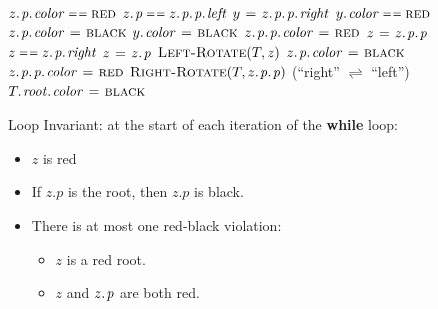 \documentclass{beamer}
\newcommand{\bi}{\begin{itemize}}
\newcommand{\ii}{\item}
\newcommand{\ei}{\end{itemize}}
\newcommand{\sect}[1]{
\section{#1}
\begin{frame}[fragile]\frametitle{#1}
}
\begin{document}
\newcommand{\rbinsertfixup}{
\begin{codebox}
  \Procname{$\proc{RB-Insert-Fixup}(T,z)$}
  \li \While $\attrib{\attrib{z}{p}}{color} \isequal \const{red}$\Do
  \li \If $\attrib{z}{p} \isequal
  \attrib{\attrib{\attrib{z}{p}}{p}}{left}$ \Do
  \li $y \gets \attrib{\attrib{\attrib{z}{p}}{p}}{right}$
  \li \If $\attrib{y}{color} \isequal \const{red}$\Do 
  \li $\attrib{\attrib{z}{p}}{color} \gets \const{black}$
  \li $\attrib{y}{color}\gets \const{black}$
  \li $\attrib{\attrib{\attrib{z}{p}}{p}}{color} \gets \const{red}$
  \li $z\gets\attrib{\attrib{z}{p}}{p}$
  \li \Else \If $z\isequal\attrib{\attrib{z}{p}}{right}$ \Do
             \li $z\gets\attrib{z}{p}$ %
             \li $\proc{Left-Rotate}(T,z)$ \End
  \li $\attrib{\attrib{z}{p}}{color} \gets \const{black}$
  \li $\attrib{\attrib{\attrib{z}{p}}{p}}{color} \gets \const{red}$
  \li $\proc{Right-Rotate}(T,\attrib{\attrib{z}{p}}{p})$
\End
  \li \Else \li (``right'' $\rightleftharpoons$ ``left'') \End
\End
  \li $\attrib{\attrib{T}{root}}{color} \gets \const{black}$
\end{codebox}
}
\sect{}
\begin{multicols}{2}
\footnotesize
\begin{codebox}
  \li \While $\attrib{\attrib{z}{p}}{color} \isequal \const{red}$\Do
  \li \If $\attrib{z}{p} \isequal
  \attrib{\attrib{\attrib{z}{p}}{p}}{left}$ \Do
  \li $y \gets \attrib{\attrib{\attrib{z}{p}}{p}}{right}$
  \li \If $\attrib{y}{color} \isequal \const{red}$\Do 
  \li $\attrib{\attrib{z}{p}}{color} \gets \const{black}$
  \li $\attrib{y}{color}\gets \const{black}$
  \li $\attrib{\attrib{\attrib{z}{p}}{p}}{color} \gets \const{red}$
  \li $z\gets\attrib{\attrib{z}{p}}{p}$
  \li \Else \If $z\isequal\attrib{\attrib{z}{p}}{right}$ \Do
             \li $z\gets\attrib{z}{p}$ %
             \li $\textnormal{\scshape Left-Rotate}(T,z)$ \End
  \li $\attrib{\attrib{z}{p}}{color} \gets \const{black}$
  \li $\attrib{\attrib{\attrib{z}{p}}{p}}{color} \gets \const{red}$
  \li $\proc{Right-Rotate}(T,\attrib{\attrib{z}{p}}{p})$
\End
  \li \Else \li (``right'' $\rightleftharpoons$ ``left'') \End
\End
  \li $\attrib{\attrib{T}{root}}{color} \gets \const{black}$
\end{codebox}

  \columnbreak
  
Loop Invariant:  at the start of each iteration of the {\bf while} loop:
\bi
\ii $z$ is red
\ii If $z.p$ is the root, then $z.p$ is black.
\ii There is at most one red-black violation:
\bi
\ii $z$ is a red root.
\ii $z$ and $\attrib{z}{p}$ are both red.
\ei
\ei
\end{multicols}
\end{frame}
\end{document}
